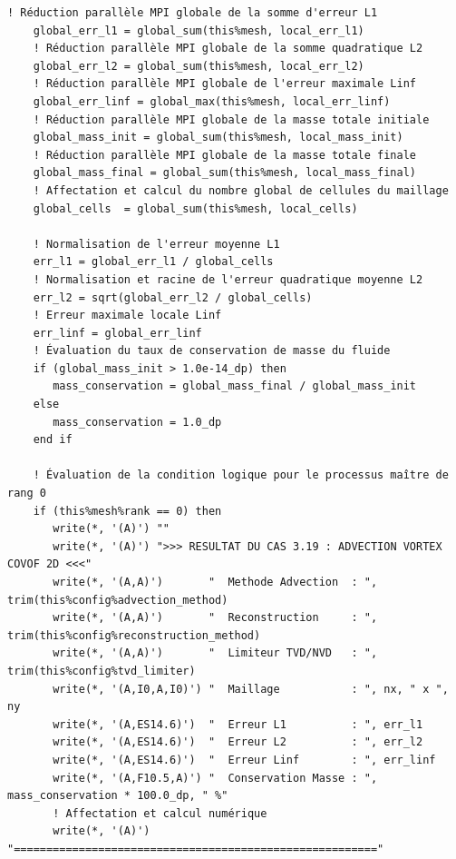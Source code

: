 \documentclass[10pt,a4paper,oneside]{book}
\begin{document}
\begin{lstlisting}[language={[95]Fortran}]
    ! Réduction parallèle MPI globale de la somme d'erreur L1
    global_err_l1 = global_sum(this%mesh, local_err_l1)
    ! Réduction parallèle MPI globale de la somme quadratique L2
    global_err_l2 = global_sum(this%mesh, local_err_l2)
    ! Réduction parallèle MPI globale de l'erreur maximale Linf
    global_err_linf = global_max(this%mesh, local_err_linf)
    ! Réduction parallèle MPI globale de la masse totale initiale
    global_mass_init = global_sum(this%mesh, local_mass_init)
    ! Réduction parallèle MPI globale de la masse totale finale
    global_mass_final = global_sum(this%mesh, local_mass_final)
    ! Affectation et calcul du nombre global de cellules du maillage
    global_cells  = global_sum(this%mesh, local_cells)

    ! Normalisation de l'erreur moyenne L1
    err_l1 = global_err_l1 / global_cells
    ! Normalisation et racine de l'erreur quadratique moyenne L2
    err_l2 = sqrt(global_err_l2 / global_cells)
    ! Erreur maximale locale Linf
    err_linf = global_err_linf
    ! Évaluation du taux de conservation de masse du fluide
    if (global_mass_init > 1.0e-14_dp) then
       mass_conservation = global_mass_final / global_mass_init
    else
       mass_conservation = 1.0_dp
    end if

    ! Évaluation de la condition logique pour le processus maître de rang 0
    if (this%mesh%rank == 0) then
       write(*, '(A)') ""
       write(*, '(A)') ">>> RESULTAT DU CAS 3.19 : ADVECTION VORTEX COVOF 2D <<<"
       write(*, '(A,A)')       "  Methode Advection  : ", trim(this%config%advection_method)
       write(*, '(A,A)')       "  Reconstruction     : ", trim(this%config%reconstruction_method)
       write(*, '(A,A)')       "  Limiteur TVD/NVD   : ", trim(this%config%tvd_limiter)
       write(*, '(A,I0,A,I0)') "  Maillage           : ", nx, " x ", ny
       write(*, '(A,ES14.6)')  "  Erreur L1          : ", err_l1
       write(*, '(A,ES14.6)')  "  Erreur L2          : ", err_l2
       write(*, '(A,ES14.6)')  "  Erreur Linf        : ", err_linf
       write(*, '(A,F10.5,A)') "  Conservation Masse : ", mass_conservation * 100.0_dp, " %"
       ! Affectation et calcul numérique
       write(*, '(A)') "========================================================"


\end{lstlisting}
\end{document}
